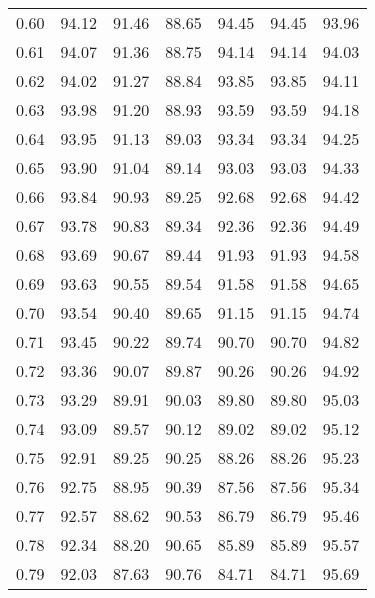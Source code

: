\begin{tabular}{|c|c|c|c|c|c|c|}
      0.60 &     94.12 &     91.46 &      88.65 &   94.45 &      94.45 &         93.96 \\
      0.61 &     94.07 &     91.36 &      88.75 &   94.14 &      94.14 &         94.03 \\
      0.62 &     94.02 &     91.27 &      88.84 &   93.85 &      93.85 &         94.11 \\
      0.63 &     93.98 &     91.20 &      88.93 &   93.59 &      93.59 &         94.18 \\
      0.64 &     93.95 &     91.13 &      89.03 &   93.34 &      93.34 &         94.25 \\
      0.65 &     93.90 &     91.04 &      89.14 &   93.03 &      93.03 &         94.33 \\
      0.66 &     93.84 &     90.93 &      89.25 &   92.68 &      92.68 &         94.42 \\
      0.67 &     93.78 &     90.83 &      89.34 &   92.36 &      92.36 &         94.49 \\
      0.68 &     93.69 &     90.67 &      89.44 &   91.93 &      91.93 &         94.58 \\
      0.69 &     93.63 &     90.55 &      89.54 &   91.58 &      91.58 &         94.65 \\
      0.70 &     93.54 &     90.40 &      89.65 &   91.15 &      91.15 &         94.74 \\
      0.71 &     93.45 &     90.22 &      89.74 &   90.70 &      90.70 &         94.82 \\
      0.72 &     93.36 &     90.07 &      89.87 &   90.26 &      90.26 &         94.92 \\
      0.73 &     93.29 &     89.91 &      90.03 &   89.80 &      89.80 &         95.03 \\
      0.74 &     93.09 &     89.57 &      90.12 &   89.02 &      89.02 &         95.12 \\
      0.75 &     92.91 &     89.25 &      90.25 &   88.26 &      88.26 &         95.23 \\
      0.76 &     92.75 &     88.95 &      90.39 &   87.56 &      87.56 &         95.34 \\
      0.77 &     92.57 &     88.62 &      90.53 &   86.79 &      86.79 &         95.46 \\
      0.78 &     92.34 &     88.20 &      90.65 &   85.89 &      85.89 &         95.57 \\
      0.79 &     92.03 &     87.63 &      90.76 &   84.71 &      84.71 &         95.69 \\

\end{tabular}
